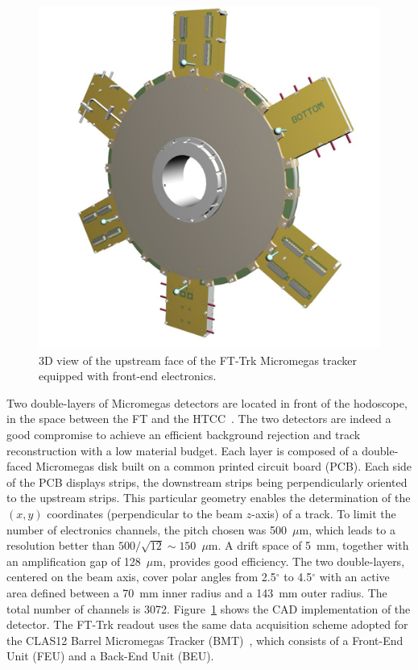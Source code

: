 \begin{figure}[th!]
\centering 
\includegraphics[width=1.0\columnwidth]{./fig/fttrk_layout.png}
\caption{3D view of the upstream face of the FT-Trk Micromegas tracker equipped with front-end electronics.}
\label{fig:ft-trck} 
\end{figure}

Two double-layers of Micromegas detectors are located in front of the hodoscope, in the space between the FT
and the HTCC~\cite{htcc}. The two detectors are indeed a good compromise to achieve an efficient background
rejection and track reconstruction with a low material budget. Each layer is composed of a double-faced
Micromegas disk built on a common printed circuit board (PCB). Each side of the PCB displays strips, the
downstream strips being perpendicularly oriented to the upstream strips. This particular geometry enables the
determination of the $(x,y)$ coordinates (perpendicular to the beam $z$-axis) of a track. To limit the
number of electronics channels, the pitch chosen was 500~$\mu$m, which leads to a resolution better than
$500/\sqrt{12} \sim 150$~$\mu$m. A drift space of 5~mm, together with an amplification gap of 128~$\mu$m,
provides good efficiency. The two double-layers, centered on the beam axis, cover polar angles from 2.5$^\circ$ to
4.5$^\circ$ with an active area defined between a 70~mm inner radius and a 143~mm outer radius. The total number
of channels is 3072. Figure~\ref{fig:ft-trck} shows the CAD implementation of the detector. The FT-Trk readout
uses the same data acquisition scheme adopted for the CLAS12 Barrel Micromegas Tracker (BMT)~\cite{mm}, which
consists of a Front-End Unit (FEU) and a Back-End Unit (BEU). 


